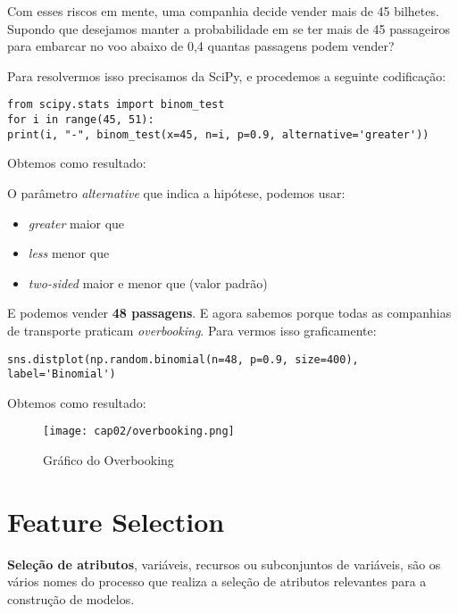 Com esses riscos em mente, uma companhia decide vender mais de 45 bilhetes. Supondo que desejamos manter a probabilidade em se ter mais de 45 passageiros para embarcar no voo abaixo de 0,4 quantas passagens podem vender?

Para resolvermos isso precisamos da SciPy, e procedemos a seguinte codificação:
\begin{lstlisting}[]
from scipy.stats import binom_test
for i in range(45, 51):
print(i, "-", binom_test(x=45, n=i, p=0.9, alternative='greater'))
\end{lstlisting}

Obtemos como resultado: \\

O parâmetro \textit{alternative} que indica a hipótese, podemos usar: \vspace{-1em}
\begin{itemize}[nolistsep]
	\item \textit{greater} maior que
	\item \textit{less} menor que
	\item \textit{two-sided} maior e menor que (valor padrão)
\end{itemize}

E podemos vender \textbf{48 passagens}. E agora sabemos porque todas as companhias de transporte praticam \textit{overbooking}. Para vermos isso graficamente:
\begin{lstlisting}[]
sns.distplot(np.random.binomial(n=48, p=0.9, size=400), label='Binomial')
\end{lstlisting}

Obtemos como resultado:
\begin{figure}[H]
	\centering
	\texttt{[image: cap02/overbooking.png]}
	\caption{Gráfico do Overbooking}
\end{figure}

\section{Feature Selection}
\textbf{Seleção de atributos}, variáveis, recursos ou subconjuntos de variáveis, são os vários nomes do processo que realiza a seleção de atributos relevantes para a construção de modelos. 

